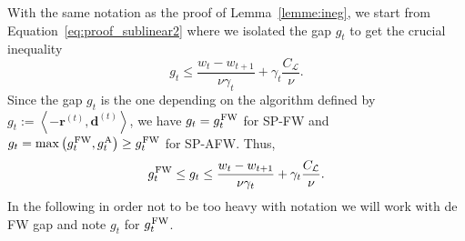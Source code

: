 \documentclass[twoside]{article}
\renewcommand{\L}{\mathcal{L}}
\newcommand{\dt}{\bm{d}^{(t)}}
\newcommand{\rt}{\r^{(t)}}
\newcommand{\wt}{w_t}
\newcommand{\gap}{g_{t}}
\newcommand{\CondNumb}{\nu}
\newcommand{\stepsize}{\gamma}
\newcommand{\FW}{{\hspace{0.05em}\textnormal{FW}}}
\newcommand{\away}{{\hspace{0.05em}\textnormal{A}}}
\renewcommand{\r}{\bm{r}}
\newcommand{\innerProd}[2]{\left\langle #1 , #2 \right\rangle}
\newcommand{\0}{\mathbf{0}} %
\begin{document}
With the same notation as the proof of Lemma~\ref{lemme:ineg}, we start from Equation~\eqref{eq:proof_sublinear2} where we isolated the gap $\gap$ to get the crucial inequality
  \begin{equation}
   \gap
         \leq \frac{\wt  -w_{t+1}}{\CondNumb \stepsize_t }
        + \gamma_t \frac{C_\L}{\CondNumb}. 
  \end{equation}
  Since the gap $\gap$ is the one depending on the algorithm  defined by $\gap := \innerProd{-\rt}{\dt}$, we have $\gap = \gap^\FW$ for SP-FW and $\gap = \max \left( \gap^\FW, \gap^\away \right)  \geq \gap^\FW$ for SP-AFW. Thus,
     \begin{equation} \label{eq:Ineg_g_wt_wtt}
    \gap^\FW \leq \gap
         \leq \frac{\wt  -w_{t+1}}{\CondNumb \stepsize_t }
        + \gamma_t \frac{C_\L}{\CondNumb}. 
  \end{equation}
  In the following in order not to be too heavy with notation we will work with de FW gap and note $\gap$ for $\gap^\FW$. 
\end{document}
